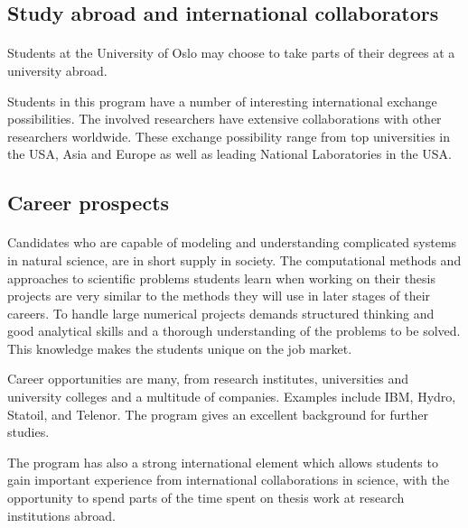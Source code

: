 \documentclass[%
oneside,                 %
final,                   %
10pt]{article}
\begin{document}
\subsection*{Study abroad and international collaborators}


\paragraph{}

Students at the University of Oslo may choose to take parts of
their degrees at a university abroad.

Students in this program have a number of interesting international
exchange possibilities. The involved researchers have extensive
collaborations with other researchers worldwide. These exchange
possibility range from top universities in the USA, Asia and Europe as
well as leading National Laboratories in the USA.



\subsection*{Career prospects}


\paragraph{}
Candidates who are capable of modeling and understanding complicated
systems in natural science, are in short supply in society.  The
computational methods and approaches to scientific problems students learn
when working on their thesis projects are very similar to the methods
they will use in later stages of their careers.  To handle large
numerical projects demands structured thinking and good analytical
skills and a thorough understanding of the problems to be solved. This
knowledge makes the students unique on the job market.

Career opportunities are many, from research institutes, universities
and university colleges and a multitude of companies. Examples
include IBM, Hydro, Statoil, and Telenor.  The program gives an
excellent background for further studies.

The program has also a strong international element which allows students to
gain important experience from international collaborations in
science, with the opportunity to spend parts of the time spent on
thesis work at research institutions abroad.
\end{document}
